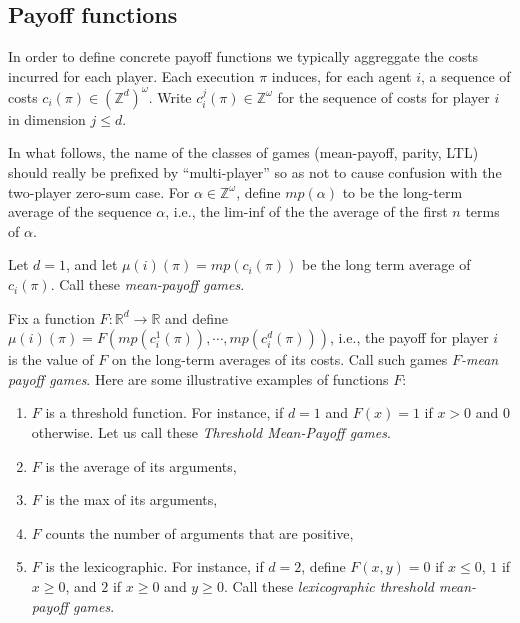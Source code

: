 \subsection{Payoff functions}

In order to define concrete payoff functions we typically aggreggate the costs incurred for each player. 
Each execution $\pi$ induces, for each agent $i$, a sequence of costs
$c_i(\pi) \in (\mathbb{Z}^d)^\omega$. Write $c_i^j(\pi) \in \mathbb{Z}^\omega$ for the sequence of costs
for player $i$ in dimension $j \leq d$.




In what follows, the name of the classes of games (mean-payoff, parity, LTL) should really be prefixed by 
``multi-player'' so as not to cause confusion with the two-player zero-sum case.
For $\alpha \in \mathbb{Z}^\omega$, define $mp(\alpha)$ to be the long-term average of the sequence $\alpha$, i.e.,
the lim-inf of the the average of the first $n$ terms of $\alpha$.


\begin{example}
Let $d = 1$, and let $\mu(i)(\pi) = mp(c_i(\pi))$ be the long term average of
$c_i(\pi)$. Call these {\em mean-payoff games}.
\end{example}

  \begin{example}
  Fix a function $F:\mathbb{R}^d \to \mathbb{R}$ and define $\mu(i)(\pi) = F(mp(c_i^1(\pi)), \cdots, mp(c_i^d(\pi)))$,
  i.e., the payoff for player $i$ is the value of $F$ on the long-term averages of its costs. 
  Call such games {\em $F$-mean payoff games}. Here are some illustrative examples of functions $F$:
\begin{enumerate}
\item $F$ is a threshold function. For instance, if $d = 1$ and $F(x) = 1$ if $x > 0$ and $0$ otherwise.
Let us call these \emph{Threshold Mean-Payoff games}.
\item $F$ is the average of its arguments, 
\item $F$ is the max of its arguments,
\item $F$ counts the number of arguments that are positive,
\item $F$ is the lexicographic. For instance, if $d = 2$, define $F(x,y) = 0$ if $x \leq 0$, $1$ if $x \geq 0$, and $2$ if $x \geq 0$ and $y \geq 0$.
Call these \emph{lexicographic threshold mean-payoff games}. 
\end{enumerate}

\end{example}

